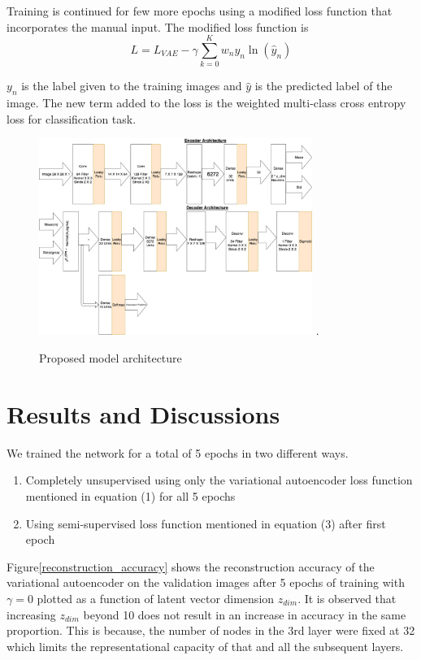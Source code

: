 \documentclass{uai2021} %
\begin{document}
Training is continued for few more epochs using a modified loss function that incorporates the manual input.
The modified loss function is
\begin{equation}
L = L_{VAE}  - \gamma \sum_{k=0}^{K}w_{n}y_{n}\ln(\hat{y}_{n})
\end{equation}

$y_n$ is the label given to the training images and $\hat{y}$ is the predicted label of the image.
The new term added to the loss is the weighted multi-class cross entropy loss for classification task.

\begin{figure}[!t]
\centering
\includegraphics[width=3.5in]{vae_model_architecture_classification.jpg}
\DeclareGraphicsExtensions.
\caption{Proposed model architecture}
\label{vae_architecture}
\end{figure}

\section{Results and Discussions} \label{results}

We trained the network for a total of 5 epochs in two different ways.
\begin{enumerate}
    \item Completely unsupervised using only the variational autoencoder loss function mentioned in equation (1) for all 5 epochs
    \item Using semi-supervised loss function mentioned in equation (3) after first epoch
\end{enumerate}


Figure\ref{reconstruction_accuracy} shows  the reconstruction accuracy of the variational autoencoder on the validation images after 5 epochs of training with $\gamma = 0$  plotted as a function of latent vector dimension $z_{dim}$.
It is observed that increasing $z_{dim}$ beyond 10 does not result in an increase in accuracy in the same proportion.
This is because, the number of nodes in the 3rd layer were fixed at 32 which limits the representational capacity of that and all the subsequent layers.
\end{document}
